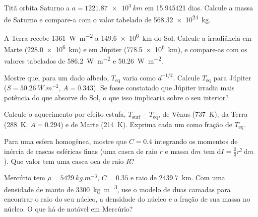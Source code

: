 \begin{exercise}[$\star\star$]\label{exo:b1:comparative-planetology:5}
Titã orbita Saturno a $a = \qty{1221.87e3}{km}$ em \num{15.945421} dias. Calcule a massa de Saturno e compare-a com o valor tabelado de \qty{568.32e24}{kg}.
\end{exercise}

\begin{exercise}[$\star\star$]\label{exo:b1:comparative-planetology:6}
A Terra recebe \qty{1361}{W.m^{-2}} a \qty{149.6e6}{km} do Sol. Calcule a irradiância em Marte (\qty{228.0e6}{km}) e em Júpiter (\qty{778.5e6}{km}), e compare-as com os valores tabelados de \qty{586.2}{W.m^{-2}} e \qty{50.26}{W.m^{-2}}.
\end{exercise}

\begin{exercise}[$\star\star$]\label{exo:b1:comparative-planetology:7}
Mostre que, para um dado albedo, $T_\mathrm{eq}$ varia como $d^{-1/2}$. Calcule $T_\mathrm{eq}$ para Júpiter ($S = \qty{50.26}{W.m^{-2}}$, $A = 0.343$). Se fosse constatado que Júpiter irradia mais potência do que absorve do Sol, o que isso implicaria sobre o seu interior?
\end{exercise}

\begin{exercise}[$\star\star$]\label{exo:b1:comparative-planetology:8}
Calcule o aquecimento por efeito estufa, $T_\mathrm{surf} - T_\mathrm{eq}$, de Vênus (\qty{737}{K}), da Terra (\qty{288}{K}, $A = 0.294$) e de Marte (\qty{214}{K}). Exprima cada um como fração de $T_\mathrm{eq}$.
\end{exercise}

\begin{exercise}[$\star\star$]\label{exo:b1:comparative-planetology:9}
Para uma esfera homogênea, mostre que $C = 0.4$ integrando os momentos de inércia de cascas esféricas finas (uma casca de raio $r$ e massa $\mathrm dm$ tem $\mathrm dI = \tfrac23 r^2\,\mathrm dm$). Que valor tem uma casca oca de raio $R$?
\end{exercise}

\begin{exercise}[$\star\star\star$]\label{exo:b1:comparative-planetology:10}
Mercúrio tem $\bar\rho = \qty{5429}{kg.m^{-3}}$, $C = 0.35$ e raio de \qty{2439.7}{km}. Com uma densidade de manto de \qty{3300}{kg.m^{-3}}, use o modelo de duas camadas para encontrar o raio do seu núcleo, a densidade do núcleo e a fração de sua massa no núcleo. O que há de notável em Mercúrio?
\end{exercise}

